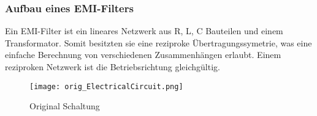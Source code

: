 \subsubsection{Aufbau eines EMI-Filters} \label{subsubsec:emi_filter}
Ein EMI-Filter ist ein lineares Netzwerk aus R, L, C Bauteilen und einem Transformator. Somit besitzten sie eine reziproke Übertragungssymetrie, was eine einfache Berechnung von verschiedenen Zusammenhängen erlaubt. Einem reziproken Netzwerk ist die Betriebsrichtung gleichgültig.


\begin{figure}[H]
	\centering
	\texttt{[image: orig\_ElectricalCircuit.png]}
	\caption{Original Schaltung \cite{aufgabenstellung}}
	\label{fig:orig_Schaltung}
\end{figure}
